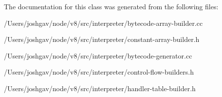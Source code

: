 The documentation for this class was generated from the following files\+:\begin{DoxyCompactItemize}
\item 
/\+Users/joshgav/node/v8/src/interpreter/bytecode-\/array-\/builder.\+cc\item 
/\+Users/joshgav/node/v8/src/interpreter/constant-\/array-\/builder.\+h\item 
/\+Users/joshgav/node/v8/src/interpreter/bytecode-\/generator.\+cc\item 
/\+Users/joshgav/node/v8/src/interpreter/control-\/flow-\/builders.\+h\item 
/\+Users/joshgav/node/v8/src/interpreter/handler-\/table-\/builder.\+h\end{DoxyCompactItemize}
